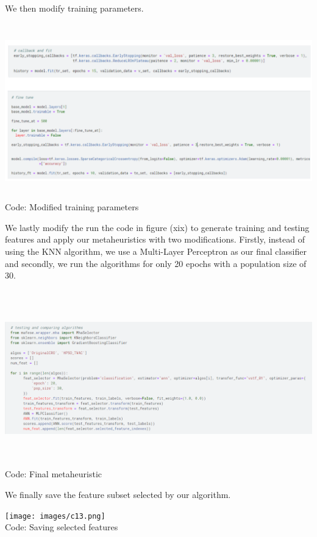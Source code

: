 		
  
We then modify training parameters.

\begin{center}
   \includegraphics[width=6in,height=3in]{images/c11.png} 
   \\\fontsize{11pt}{24pt} Code: Modified training parameters
\end{center}
		
  
We lastly modify the run the code in figure (xix) to generate training and testing features and apply our metaheuristics with two modifications. Firstly, instead of using the KNN algorithm, we use a Multi-Layer Perceptron as our final classifier and secondly, we run the algorithms for only 20 epochs with a population size of 30.

\begin{center}
   \includegraphics[width=6in, height=3in]{images/c12.png} 
   \\\fontsize{11pt}{24pt} Code: Final metaheuristic
\end{center}
		
		
  
We finally save the feature subset selected by our algorithm.


\begin{center}
   \texttt{[image: images/c13.png]} 
   \\\fontsize{11pt}{24pt} Code: Saving selected features
\end{center}
		
		
